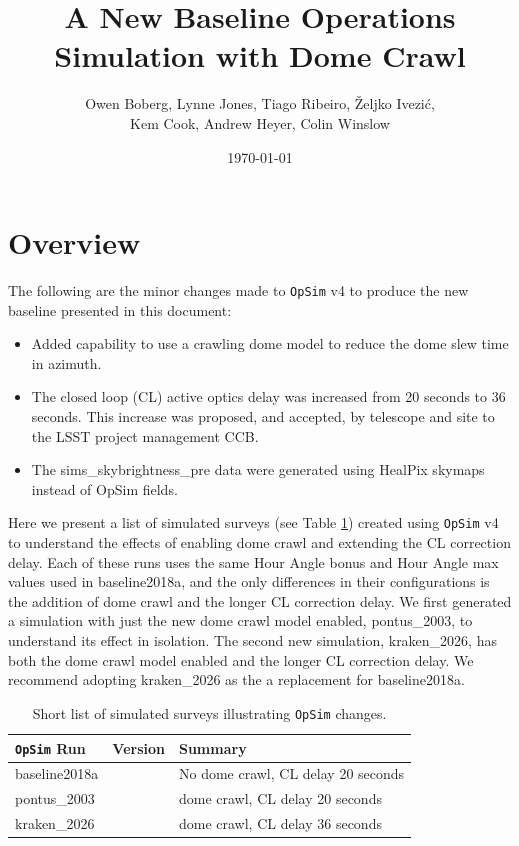 \documentclass[DM,authoryear,toc]{lsstdoc}
\title{A New Baseline Operations Simulation with Dome Crawl}
\author{%
Owen Boberg,
Lynne Jones,
Tiago Ribeiro,
\v{Z}eljko Ivezi\'{c}, \\
Kem Cook, Andrew Heyer,
Colin Winslow}
\date{\today}
\newcommand{\opsim}{\texttt{OpSim}\xspace}
\begin{document}
\maketitle

\section{Overview}

The following are the minor changes made to \opsim v4 to produce the new baseline presented in this document:

\begin{itemize}
\item Added capability to use a crawling dome model to reduce the dome slew time in azimuth.
\item The closed loop (CL) active optics delay was increased from 20 seconds to 36 seconds.
This increase was proposed, and accepted, by telescope and site to the LSST project management CCB.
\item The sims\_skybrightness\_pre data were generated using HealPix skymaps instead of OpSim fields.
\end{itemize}

Here we present a list of simulated surveys (see Table \ref{tab:runlist}) created using \opsim v4 to understand
the effects of enabling dome crawl and extending the CL correction delay. Each of these runs uses the same Hour
Angle bonus and Hour Angle max values used in baseline2018a, and the only differences in their configurations is the
addition of dome crawl and the longer CL correction delay. We first generated a simulation with just the new dome crawl model
enabled, pontus\_2003, to understand its effect in isolation. The second new simulation, kraken\_2026, has both the
dome crawl model enabled and the longer CL correction delay. We recommend adopting kraken\_2026 as the a replacement
for baseline2018a.

\begin{table}[htp]
\caption{Short list of simulated surveys illustrating \opsim changes.}
\begin{center}
\begin{tabular}{ l | l | l }
\toprule
\opsim Run & Version & Summary \\
\midrule
baseline2018a &   &  No dome crawl, CL delay 20 seconds\\
pontus\_2003  &   &  dome crawl, CL delay 20 seconds\\
kraken\_2026  &   &  dome crawl, CL delay 36 seconds\\
\bottomrule
\end{tabular}
\end{center}
\label{tab:runlist}
\end{table}
\end{document}
